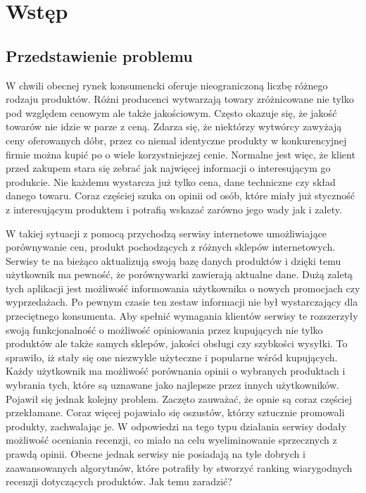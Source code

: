 \chapter{Wstęp}

\section{Przedstawienie problemu}

W chwili obecnej rynek konsumencki oferuje nieograniczoną liczbę różnego rodzaju produktów. Różni producenci wytwarzają towary zróżnicowane nie tylko pod względem cenowym ale także jakościowym. Często okazuje się, że jakość towarów nie idzie w parze z ceną. Zdarza się, że niektórzy wytwórcy  zawyżają ceny oferowanych dóbr, przez co niemal identyczne produkty w konkurencyjnej firmie można kupić po o wiele korzystniejszej cenie. Normalne jest więc, że klient przed zakupem stara się zebrać jak najwięcej informacji o interesującym go produkcie. Nie każdemu wystarcza już tylko cena, dane techniczne czy skład danego towaru.  Coraz częściej szuka on opinii od osób, które miały już styczność z interesującym produktem i potrafią wskazać zarówno jego wady jak i zalety. 

W takiej sytuacji z pomocą przychodzą serwisy internetowe umożliwiające porównywanie cen, produkt pochodzących z różnych sklepów internetowych. Serwisy te na bieżąco aktualizują swoją bazę danych produktów i dzięki temu użytkownik ma pewność, że porównywarki zawierają aktualne dane. Dużą zaletą tych aplikacji jest możliwość informowania użytkownika o nowych promocjach czy wyprzedażach. Po pewnym czasie ten zestaw informacji nie był wystarczający dla przeciętnego konsumenta. Aby spełnić wymagania klientów serwisy te rozszerzyły swoją funkcjonalność o możliwość opiniowania przez kupujących nie tylko produktów ale także samych sklepów, jakości obsługi czy szybkości wysyłki. To sprawiło, iż stały się one niezwykle użyteczne i popularne wśród kupujących. Każdy użytkownik ma możliwość porównania opinii o wybranych produktach i wybrania tych, które są uznawane jako najlepsze przez innych użytkowników. Pojawił się jednak kolejny problem. Zaczęto zauważać, że opnie są coraz częściej przekłamane. Coraz więcej pojawiało się oszustów, którzy sztucznie promowali produkty, zachwalając je. W odpowiedzi na tego typu działania serwisy dodały możliwość oceniania recenzji, co miało na celu wyeliminowanie sprzecznych z prawdą opinii. Obecne jednak serwisy nie posiadają na tyle dobrych i zaawansowanych algorytmów, które potrafiły by stworzyć ranking wiarygodnych recenzji dotyczących produktów. Jak temu zaradzić?  


